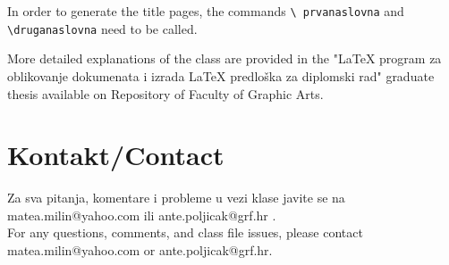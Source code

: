 \documentclass{unizgklasa}
\begin{document}
In order to generate the title pages, the commands  \verb=\ prvanaslovna= and \verb=\druganaslovna= need to be called.

More detailed explanations of the class are provided in the "\LaTeX{} program za oblikovanje dokumenata i izrada \LaTeX{} predloška za diplomski rad" graduate thesis available on Repository of Faculty of Graphic Arts.
\section{Kontakt/Contact}

Za sva pitanja, komentare i probleme u vezi klase javite se na matea.milin@yahoo.com ili ante.poljicak@grf.hr .\\

For any questions, comments, and class file issues, please contact matea.milin@yahoo.com or ante.poljicak@grf.hr.
\end{document}
